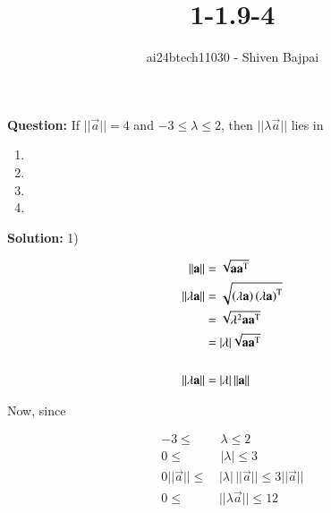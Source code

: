 \documentclass[journal]{IEEEtran}
\begin{document}
\onecolumn

\vspace{3cm}

\renewcommand{\thefigure}{\theenumi}
\renewcommand{\thetable}{\theenumi}

\title{1-1.9-4}
\author{ai24btech11030 - Shiven Bajpai}
\maketitle

\renewcommand{\thefigure}{\theenumi}
\renewcommand{\thetable}{\theenumi}

\textbf{Question: } If $\vert\vert\vec{a}\vert\vert = 4$ and $-3 \leq \lambda \leq 2$, then $\vert\vert \lambda \vec{a}\vert\vert$ lies in

\begin{enumerate}
    \item {}
    \item {}
    \item {}
    \item {}
\end{enumerate}

\textbf{Solution: } 1) 

\begin{align*}
    \vert\vert\mathbf{a}\vert\vert &= \sqrt{\mathbf{a}\mathbf{a}^\text{T}}\\
    \vert\vert\lambda\mathbf{a}\vert\vert &= \sqrt{\left(\lambda \mathbf{a}\right)\left(\lambda \mathbf{a}\right)^\text{T}}\\
    &= \sqrt{\lambda^2 \mathbf{a}\mathbf{a}^\text{T}}\\
    &= \vert\lambda\vert \sqrt{\mathbf{a}\mathbf{a}^\text{T}}\\
    \\
    \vert\vert\lambda\mathbf{a}\vert\vert &= \vert\lambda\vert \, \vert\vert\mathbf{a}\vert\vert
\end{align*}

Now, since

\begin{align*}
    -3 \leq& \; \lambda \leq 2\\
    0 \leq& \; \vert\lambda\vert \leq 3\\
    0\vert\vert\vec{a}\vert\vert \leq&\, \vert\lambda\vert\,\vert\vert\vec{a}\vert\vert \leq 3\vert\vert\vec{a}\vert\vert\\
    0 \leq&\, \vert\vert\lambda\vec{a}\vert\vert \leq 12\\
\end{align*}
\end{document}
